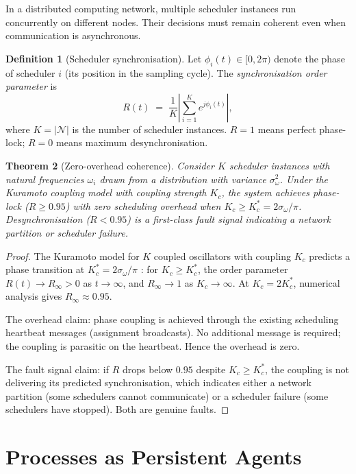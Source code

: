 \documentclass[11pt,twocolumn,a4paper]{article}
\theoremstyle{plain}
\newtheorem{theorem}{Theorem}[section]
\theoremstyle{definition}
\newtheorem{definition}[theorem]{Definition}
\theoremstyle{remark}
\newcommand{\N}{\mathcal{N}}
\newcommand{\abs}[1]{\left|#1\right|}
\begin{document}
In a distributed computing network, multiple scheduler instances run concurrently on different nodes. Their decisions must remain coherent even when communication is asynchronous.

\begin{definition}[Scheduler synchronisation]
\label{def:sync}
Let $\phi_i(t) \in [0, 2\pi)$ denote the phase of scheduler $i$ (its position in the sampling cycle). The \emph{synchronisation order parameter} is
\[
  R(t) \;=\; \frac{1}{K} \abs{\sum_{i=1}^K e^{j\phi_i(t)}},
\]
where $K = |\N|$ is the number of scheduler instances. $R = 1$ means perfect phase-lock; $R = 0$ means maximum desynchronisation.
\end{definition}

\begin{theorem}[Zero-overhead coherence]
\label{thm:phaselock}
Consider $K$ scheduler instances with natural frequencies $\omega_i$ drawn from a distribution with variance $\sigma_\omega^2$. Under the Kuramoto coupling model \cite{kuramoto1984} with coupling strength $K_c$, the system achieves phase-lock ($R \geq 0.95$) with zero scheduling overhead when $K_c \geq K_c^* = 2\sigma_\omega / \pi$. Desynchronisation ($R < 0.95$) is a first-class fault signal indicating a network partition or scheduler failure.
\end{theorem}

\begin{proof}
The Kuramoto model for $K$ coupled oscillators with coupling $K_c$ predicts a phase transition at $K_c^* = 2\sigma_\omega/\pi$ \cite{strogatz2003}: for $K_c \geq K_c^*$, the order parameter $R(t) \to R_\infty > 0$ as $t \to \infty$, and $R_\infty \to 1$ as $K_c \to \infty$. At $K_c = 2K_c^*$, numerical analysis gives $R_\infty \approx 0.95$.

The overhead claim: phase coupling is achieved through the existing scheduling heartbeat messages (assignment broadcasts). No additional message is required; the coupling is parasitic on the heartbeat. Hence the overhead is zero.

The fault signal claim: if $R$ drops below $0.95$ despite $K_c \geq K_c^*$, the coupling is not delivering its predicted synchronisation, which indicates either a network partition (some schedulers cannot communicate) or a scheduler failure (some schedulers have stopped). Both are genuine faults.
\end{proof}

\section{Processes as Persistent Agents}
\label{sec:agents}
\end{document}
